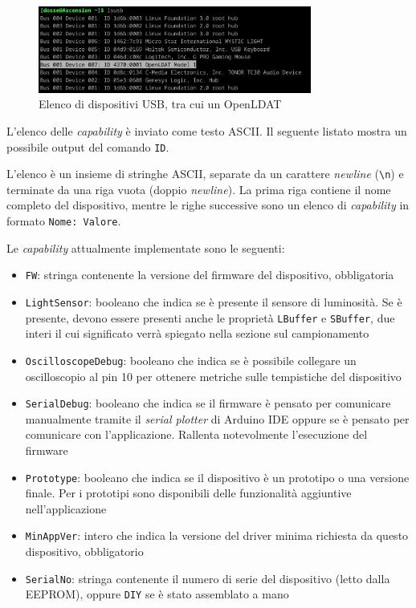 \begin{figure}[h]
	\centering
	\includegraphics[width=0.8\textwidth]{Dispositivo_files/lsusb.png}
	\caption{Elenco di dispositivi USB, tra cui un OpenLDAT}
	\label{fig:lsusb}
\end{figure}

L'elenco delle \textit{capability} è inviato come testo ASCII. Il seguente listato mostra un possibile output del comando \texttt{ID}.

L'elenco è un insieme di stringhe ASCII, separate da un carattere \textit{newline} (\texttt{\textbackslash n}) e terminate da una riga vuota (doppio \textit{newline}). La prima riga contiene il nome completo del dispositivo, mentre le righe successive sono un elenco di \textit{capability} in formato \texttt{Nome: Valore}.

Le \textit{capability} attualmente implementate sono le seguenti:
\begin{itemize}
	\item \texttt{FW}: stringa contenente la versione del firmware del dispositivo, obbligatoria
	\item \texttt{LightSensor}: booleano che indica se è presente il sensore di luminosità. Se è presente, devono essere presenti anche le proprietà \texttt{LBuffer} e \texttt{SBuffer}, due interi il cui significato verrà spiegato nella sezione sul campionamento
	\item \texttt{OscilloscopeDebug}: booleano che indica se è possibile collegare un oscilloscopio al pin 10 per ottenere metriche sulle tempistiche del dispositivo
	\item \texttt{SerialDebug}: booleano che indica se il firmware è pensato per comunicare manualmente tramite il \textit{serial plotter} di Arduino IDE oppure se è pensato per comunicare con l'applicazione. Rallenta notevolmente l'esecuzione del firmware
	\item \texttt{Prototype}: booleano che indica se il dispositivo è un prototipo o una versione finale. Per i prototipi sono disponibili delle funzionalità aggiuntive nell'applicazione
	\item \texttt{MinAppVer}: intero che indica la versione del driver minima richiesta da questo dispositivo, obbligatorio
	\item \texttt{SerialNo}: stringa contenente il numero di serie del dispositivo (letto dalla EEPROM), oppure \texttt{DIY} se è stato assemblato a mano
\end{itemize}

